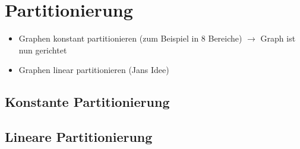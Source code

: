 \section{Partitionierung}

\begin{itemize}
  \item Graphen konstant partitionieren (zum Beispiel in 8 Bereiche) $\rightarrow$ Graph ist nun gerichtet
  \item Graphen linear partitionieren (Jans Idee)
\end{itemize}

\subsection{Konstante Partitionierung}

\subsection{Lineare Partitionierung}
